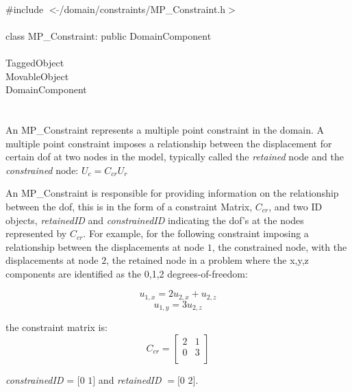 
   \\
\indent \#include $<\tilde{ }$/domain/constraints/MP\_Constraint.h$>$  \\

  \\
\indent class MP\_Constraint: public DomainComponent  \\

 \\
\indent TaggedObject \\
\indent MovableObject \\
\indent\indent DomainComponent \\
\indent\indent{} \\

  \\
\indent An MP\_Constraint represents a multiple point constraint in the
domain. A multiple point constraint imposes a relationship between the
displacement for certain dof at two nodes in the model, typically called
the {\em retained} node and the {\em constrained} node: $U_c = C_{cr} U_r$


An MP\_Constraint is responsible for providing information on the
relationship between the dof, this is in the form of a constraint
Matrix, $C_{cr}$, and two ID objects, {\em retainedID} and {\em
constrainedID} indicating the dof's at the nodes 
represented by $C_{cr}$. For example, for the following constraint
imposing a relationship between the displacements at node $1$, the 
constrained node, with the displacements at node $2$, the retained
node in a problem where the x,y,z components are identified as the
0,1,2 degrees-of-freedom:

$$ u_{1,x} = 2 u_{2,x} + u_{2,z} $$
$$ u_{1,y} = 3 u_{2,z}$$

the constraint matrix is:
$$ C_{cr} =
\left[
\begin{array}{cc}
2 & 1  \\
0 & 3  \\
\end{array}
\right] 
$$

{\em constrainedID} = $[0$ $1]$ and {\em retainedID} $= [0$ $2]$. \\

